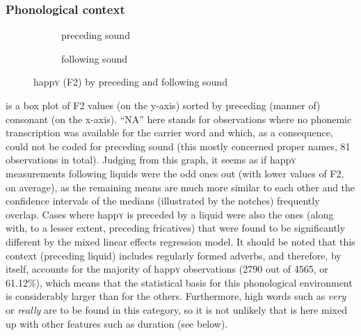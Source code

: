 \subsubsection{Phonological context}
\label{sec.prod.res.vow.happy.f2.phon}

\begin{figure}
	
	\begin{subfigure}{.49\textwidth}
		
			\resizebox{\linewidth}{!}{} 
		\caption{preceding sound}
		\label{fig.box.f2w.happy.presound}
	\end{subfigure}
	\begin{subfigure}{.49\textwidth}
		
			\resizebox{\linewidth}{!}{} 
		\caption{following sound}
		\label{fig.box.f2w.happy.follsound}
	\end{subfigure}
	\caption{happ\textsc{y} (F2) by preceding and following sound}
\end{figure}

 is a box plot of F2 values (on the y-axis) sorted by preceding (manner of) consonant (on the x-axis).
``NA'' here stands for observations where no phonemic transcription was available for the carrier word and which, as a consequence, could not be coded for preceding sound (this mostly concerned proper names, 81 observations in total).
Judging from this graph, it seems as if happ\textsc{y} measurements following liquids were the odd ones out (with lower values of F2, on average), as the remaining means are much more similar to each other and the confidence intervals of the medians (illustrated by the notches) frequently overlap.
Cases where happ\textsc{y} is preceded by a liquid were also the ones (along with, to a lesser extent, preceding fricatives) that were found to be significantly different by the mixed linear effects regression model.
It should be noted that this context (preceding liquid) includes regularly formed adverbs, and therefore, by itself, accounts for the majority of happ\textsc{y} observations (2790 out of 4565, or 61.12\%), which means that the statistical basis for this phonological environment is considerably larger than for the others.
Furthermore, high  words such as \emph{very} or \emph{really} are to be found in this category, so it is not unlikely that  is here mixed up with other features such as duration (see below).


